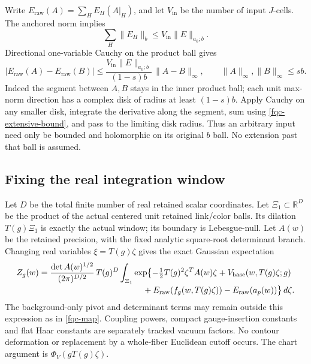 \documentclass[11pt]{article}
\theoremstyle{remark}
\begin{document}
Write $E_{\mathrm{raw}}(A)=\sum_H E_H(A|_H)$, and let
$V_{\mathrm{in}}$ be the number of input $J$-cells. The anchored norm
implies
\begin{equation}
 \sum_H\lVert E_H\rVert_b
       \leq V_{\mathrm{in}}\lVert E\rVert_{a_0;b}.
 \label{fqc-extensive-bound}
\end{equation}
Directional one-variable Cauchy on the product ball gives
\begin{equation}
 |E_{\mathrm{raw}}(A)-E_{\mathrm{raw}}(B)|
 \leq
 \frac{V_{\mathrm{in}}\lVert E\rVert_{a_0;b}}
      {(1-s)b}\,\lVert A-B\rVert_\infty,
 \qquad \lVert A\rVert_\infty,\lVert B\rVert_\infty\leq sb.
 \label{fqc-input-cauchy}
\end{equation}
Indeed the segment between $A,B$ stays in the inner product ball;
each unit max-norm direction has a complex disk of radius at least
$(1-s)b$. Apply Cauchy on any smaller disk, integrate the derivative
along the segment, sum using \eqref{fqc-extensive-bound}, and pass
to the limiting disk radius. Thus an arbitrary input need only be
bounded and holomorphic on its original $b$ ball. No extension
past that ball is assumed.

\subsection{Fixing the real integration window}
\label{fqc-integral-section}

Let $D$ be the total finite number of real retained scalar
coordinates. Let $\Xi_1\subset\mathbb R^D$ be the product of the
actual centered unit retained link/color balls. Its dilation
$T(g)\Xi_1$ is exactly the actual window; its boundary is
Lebesgue-null. Let $A(w)$ be the retained precision, with the
fixed analytic square-root determinant branch. Changing real
variables $\xi=T(g)\zeta$ gives the exact Gaussian expectation
\begin{align}
 Z_g(w)
 ={}&\frac{\det A(w)^{1/2}}{(2\pi)^{D/2}}\,T(g)^D
       \int_{\Xi_1}
       \exp\bigl\{
          -\tfrac12 T(g)^2\zeta^T A(w)\zeta
          +V_{\mathrm{base}}(w,T(g)\zeta;g)
 \notag\\[-2pt]
 &\hspace{39mm}
          +E_{\mathrm{raw}}(f_g(w,T(g)\zeta))
          -E_{\mathrm{raw}}(a_p(w))
       \bigr\}\,d\zeta .
 \label{fqc-integral}
\end{align}
The background-only pivot and determinant terms may remain outside
this expression as in \eqref{fqc-map}. Coupling powers, compact
gauge-insertion constants and flat Haar constants are separately
tracked vacuum factors. No contour deformation or replacement
by a whole-fiber Euclidean cutoff occurs. The chart argument is
$\Phi_V(gT(g)\zeta)$.
\end{document}
